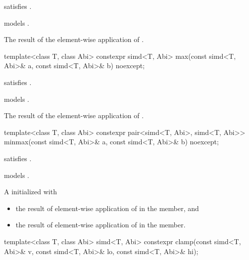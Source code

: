 \begin{itemdescr}
  \pnum\constraints
   satisfies .

  \pnum\expects
   models .

  \pnum\returns
  The result of the element-wise application of  \foralli.
\end{itemdescr}

\begin{itemdecl}
template<class T, class Abi> constexpr simd<T, Abi> max(const simd<T, Abi>& a, const simd<T, Abi>& b) noexcept;
\end{itemdecl}

\begin{itemdescr}
  \pnum\constraints
   satisfies .

  \pnum\expects
   models .

  \pnum\returns
  The result of the element-wise application of  \foralli.
\end{itemdescr}

\begin{itemdecl}
template<class T, class Abi>
  constexpr pair<simd<T, Abi>, simd<T, Abi>> minmax(const simd<T, Abi>& a, const simd<T, Abi>& b) noexcept;
\end{itemdecl}

\begin{itemdescr}
  \pnum\constraints
   satisfies .

  \pnum\expects
   models .

  \pnum\returns
  A  initialized with
  \begin{itemize}
    \item the result of element-wise application of  \foralli{} in the  member, and
    \item the result of element-wise application of  \foralli{} in the  member.
  \end{itemize}
\end{itemdescr}

\begin{itemdecl}
template<class T, class Abi> simd<T, Abi>
  constexpr clamp(const simd<T, Abi>& v, const simd<T, Abi>& lo, const simd<T, Abi>& hi);
\end{itemdecl}

